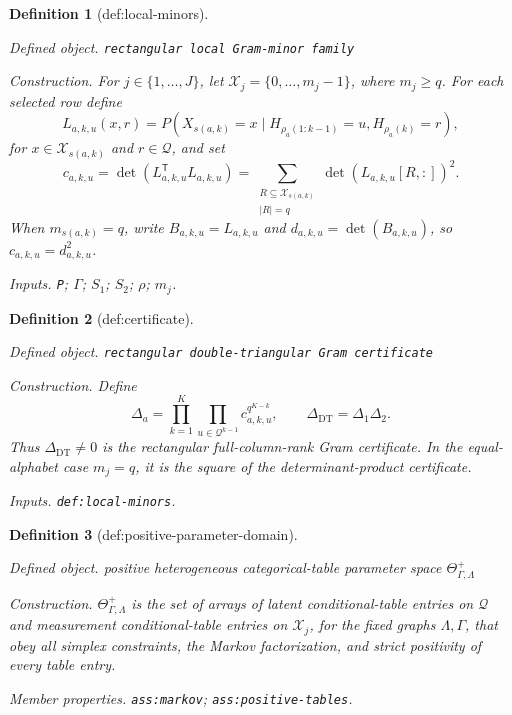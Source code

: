 \documentclass{article}
\newtheorem{definition}{Definition}
\begin{document}
\begin{definition}[def:local-minors]\label{def:local-minors}
\par\smallskip\noindent\emph{Defined object.} \texttt{rectangular local Gram-\allowbreak{}minor family}
\par\smallskip\noindent\emph{Construction.} For \(j\in\{1,\ldots,J\}\), let \(\mathcal X_j=\{0,\ldots,m_j-1\}\), where \(m_j\ge q\).  For each selected row define
\[
 L_{a,k,u}(x,r)
 =P\!\left(X_{s(a,k)}=x\mid
 H_{\rho_a(1:k-1)}=u,H_{\rho_a(k)}=r\right),
\]
for \(x\in\mathcal X_{s(a,k)}\) and \(r\in\mathcal Q\), and set
\[
 c_{a,k,u}=\det\!\left(L_{a,k,u}^{\mathsf T}L_{a,k,u}\right)
 =\sum_{\substack{R\subseteq\mathcal X_{s(a,k)}\\|R|=q}}
   \det\!\left(L_{a,k,u}[R,:]\right)^2.
\]
When \(m_{s(a,k)}=q\), write \(B_{a,k,u}=L_{a,k,u}\) and \(d_{a,k,u}=\det(B_{a,k,u})\), so \(c_{a,k,u}=d_{a,k,u}^2\).
\par\smallskip\noindent\emph{Inputs.} \texttt{P}; \(\Gamma\); \(S_1\); \(S_2\); \(\rho\); \(m_j\).
\end{definition}

\begin{definition}[def:certificate]\label{def:certificate}
\par\smallskip\noindent\emph{Defined object.} \texttt{rectangular double-\allowbreak{}triangular Gram certificate}
\par\smallskip\noindent\emph{Construction.} Define
\[
 \Delta_a=\prod_{k=1}^K\prod_{u\in\mathcal Q^{k-1}}
 c_{a,k,u}^{q^{K-k}},
 \qquad
 \Delta_{\mathrm{DT}}=\Delta_1\Delta_2.
\]
Thus \(\Delta_{\mathrm{DT}}\neq0\) is the rectangular full-column-rank Gram certificate.  In the equal-alphabet case \(m_j=q\), it is the square of the determinant-product certificate.
\par\smallskip\noindent\emph{Inputs.} \texttt{def:\allowbreak{}local-\allowbreak{}minors}.
\end{definition}

\begin{definition}[def:positive-parameter-domain]\label{def:positive-parameter-domain}
\par\smallskip\noindent\emph{Defined object.} positive heterogeneous categorical-table parameter space \(\Theta_{\Gamma,\Lambda}^{+}\)
\par\smallskip\noindent\emph{Construction.} \(\Theta_{\Gamma,\Lambda}^{+}\) is the set of arrays of latent conditional-table entries on \(\mathcal Q\) and measurement conditional-table entries on \(\mathcal X_j\), for the fixed graphs \(\Lambda,\Gamma\), that obey all simplex constraints, the Markov factorization, and strict positivity of every table entry.
\par\smallskip\noindent\emph{Member properties.} \texttt{ass:\allowbreak{}markov}; \texttt{ass:\allowbreak{}positive-\allowbreak{}tables}.
\end{definition}
\end{document}

